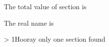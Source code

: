 \documentclass{article}
\begin{document}
The total value of section is 

The real name is %


\ifnum{} > 1\relax Hooray \else only one section found\fi
\blinddocument

\blinddocument
\end{document}
